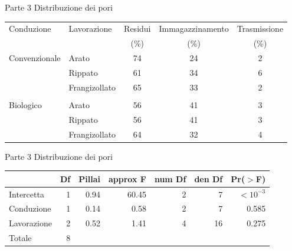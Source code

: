 \documentclass[10pt]{beamer}
\begin{document}
\begin{frame}{Parte 3 \small{Distribuzione dei pori}}

  \footnotesize
  \begin{table}[hb]
    \centering
    \begin{tabular}{llccc}%
      \hline
      Conduzione & Lavorazione & Residui & Immagazzinamento &
                                                              Trasmissione \\ 
                 &             & (\%) &  (\%) &  (\%) \\ 
      \hline
      Convenzionale & Arato & 74 & 24 & 2 \\ 
                 & Rippato & 61 & 34 & 6 \\ 
                 & Frangizollato & 65 & 33 & 2 \\ 
                 &  &  &  &  \\ 
      Biologico & Arato & 56 & 41 & 3 \\ 
                 & Rippato & 56 & 41 & 3 \\ 
                 & Frangizollato & 64 & 32 & 4 \\ 
      \hline
    \end{tabular}
  \end{table}
\end{frame}

\begin{frame}{Parte 3 \small{Distribuzione dei pori}}
  \begin{table}[ht]
    \centering
    \begin{tabular}{lrrrrrr}
      \hline
      & Df & Pillai & approx F & num Df & den Df & Pr($>$F) \\ 
      \hline
      Intercetta & 1 & 0.94 & 60.45 & 2 & 7 & $<10^{-3}$ \\ 
      Conduzione & 1 & 0.14 & 0.58 & 2 & 7 & 0.585 \\ 
      Lavorazione & 2 & 0.52 & 1.41 & 4 & 16 & 0.275 \\ 
      Totale & 8 &  &  &  &  &  \\ 
      \hline
    \end{tabular}
  \end{table}
\end{frame}
\end{document}
